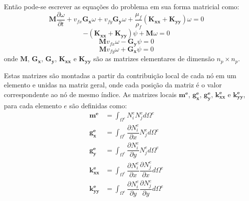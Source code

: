 Então pode-se escrever as equações do problema em sua forma matricial como:
\begin{equation}
    \mathbf{M}
    \dfrac{\partial \omega}{\partial t} +
    v_{fx}
    \mathbf{G_x}
    \omega +
    v_{fy}
    \mathbf{G_y}
    \omega +
    \dfrac{\mu_f}{\rho_f}
    \left(
    \mathbf{K_{xx}} +
    \mathbf{K_{yy}}
    \right)
    \omega = 0
    \label{last_dt}
\end{equation}
\begin{equation}
    -\left(
    \mathbf{K_{xx}} +
    \mathbf{K_{yy}}
    \right)
    \psi +
    \mathbf{M}
    \omega = 0
\end{equation}
\begin{equation}
    \mathbf{M}
    v_{fx}
    \omega -
    \mathbf{G_y}
    \psi = 0
\end{equation}
\begin{equation}
    \mathbf{M}
    v_{fy}
    \omega +
    \mathbf{G_x}
    \psi = 0
\end{equation}
onde $\mathbf{M}$, $\mathbf{G_{x}}$, $\mathbf{G_{y}}$, $\mathbf{K_{xx}}$ e $\mathbf{K_{yy}}$ são as matrizes elementares de dimensão $n_p \times n_p$.

Estas matrizes são montadas a partir da contribuição local de cada nó em um elemento e unidas na matriz geral, onde cada posição da matriz é o valor correspondente ao nó de mesmo índice.
As matrizes locais $\mathbf{m^e}$, $\mathbf{g_{x}^e}$, $\mathbf{g_{y}^e}$, $\mathbf{k_{xx}^e}$ e $\mathbf{k_{yy}^e}$, para cada elemento $e$ são definidas como:
\begin{align}
    \mathbf{m^e} &=
    \int_{\Omega^e}
    N_i^e N_j^e
    d\Omega^e \\
    \mathbf{g_x^e} &=
    \int_{\Omega^e}
    \dfrac{\partial N_i^e}{\partial x}
    N_j^e
    d\Omega^e \\
    \mathbf{g_y^e} &=
    \int_{\Omega^e}
    \dfrac{\partial N_i^e}{\partial y}
    N_j^e
    d\Omega^e \\
    \mathbf{k_{xx}^e} &=
    \int_{\Omega^e}
    \dfrac{\partial N_i^e}{\partial x}
    \dfrac{\partial N_j^e}{\partial x}
    d\Omega^e \\
    \mathbf{k_{yy}^e} &=
    \int_{\Omega^e}
    \dfrac{\partial N_i^e}{\partial y}
    \dfrac{\partial N_j^e}{\partial y}
    d\Omega^e
\end{align}

